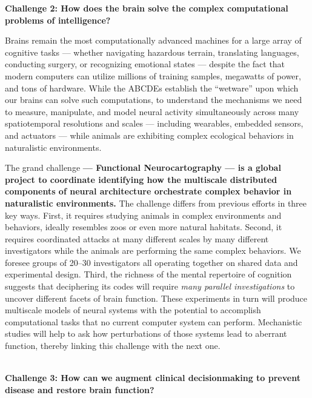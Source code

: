 \documentclass{amsart}
\begin{document}
\begin{center}
\large \bf Challenge 2: How does the brain solve the complex 
computational problems of intelligence?
\vspace{6pt}
\end{center}


Brains remain the most computationally advanced machines for a large
array of cognitive tasks --- whether navigating hazardous terrain,
translating languages, conducting surgery, or recognizing emotional
states --- despite the fact that modern computers can utilize millions of
training samples, megawatts of power, and tons of hardware. While the
ABCDEs establish the ``wetware'' upon which our brains can solve such
computations, to understand the mechanisms we need to measure,
manipulate, and model neural activity simultaneously across many
spatiotemporal resolutions and scales --- including wearables, embedded
sensors, and actuators --- while animals are exhibiting complex ecological
behaviors in naturalistic environments.

The grand challenge {\bf --- Functional Neurocartography --- is a global project
to coordinate identifying how the multiscale distributed components of
neural architecture orchestrate complex behavior in naturalistic
environments.}  The challenge differs from previous efforts in three key
ways. First, it requires studying animals in complex environments and
behaviors, ideally resembles zoos or even more natural habitats. Second,
it requires coordinated attacks at many different scales by many
different investigators while the animals are performing the same
complex behaviors. We foresee groups of 20--30 investigators all
operating together on shared
data and experimental design. Third, the richness of the mental
repertoire of cognition suggests that deciphering its codes will require
\textit{many parallel investigations} to uncover different facets of brain
function. These experiments in turn will produce multiscale models of
neural systems with the potential to accomplish computational tasks that
no current computer system can perform. Mechanistic studies will help to
ask how perturbations of those systems lead to aberrant function,
thereby linking this challenge with the next one. \\ \\ 

\begin{center}
\large \bf Challenge 3: How can we augment clinical decision­making to
prevent disease and restore brain function? 
\vspace{6pt}
\end{center}
\end{document}
